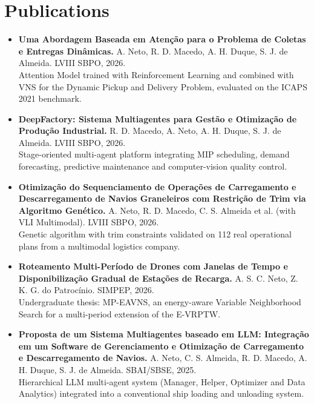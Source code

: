 \documentclass[a4paper,10pt]{article}
\begin{document}
\section*{ Publications}
\begin{itemize}[label=]
    \item \textbf{Uma Abordagem Baseada em Atenção para o Problema de Coletas e Entregas Dinâmicas.} A. Neto, R. D. Macedo, A. H. Duque, S. J. de Almeida. LVIII SBPO, 2026. \\
    Attention Model trained with Reinforcement Learning and combined with VNS for the Dynamic Pickup and Delivery Problem, evaluated on the ICAPS 2021 benchmark.
    \item \textbf{DeepFactory: Sistema Multiagentes para Gestão e Otimização de Produção Industrial.} R. D. Macedo, A. Neto, A. H. Duque, S. J. de Almeida. LVIII SBPO, 2026. \\
    Stage-oriented multi-agent platform integrating MIP scheduling, demand forecasting, predictive maintenance and computer-vision quality control.
    \item \textbf{Otimização do Sequenciamento de Operações de Carregamento e Descarregamento de Navios Graneleiros com Restrição de Trim via Algoritmo Genético.} A. Neto, R. D. Macedo, C. S. Almeida et al. (with VLI Multimodal). LVIII SBPO, 2026. \\
    Genetic algorithm with trim constraints validated on 112 real operational plans from a multimodal logistics company.
    \item \textbf{Roteamento Multi-Período de Drones com Janelas de Tempo e Disponibilização Gradual de Estações de Recarga.} A. S. C. Neto, Z. K. G. do Patrocínio. SIMPEP, 2026. \\
    Undergraduate thesis: MP-EAVNS, an energy-aware Variable Neighborhood Search for a multi-period extension of the E-VRPTW.
    \item \textbf{Proposta de um Sistema Multiagentes baseado em LLM: Integração em um Software de Gerenciamento e Otimização de Carregamento e Descarregamento de Navios.} A. Neto, C. S. Almeida, R. D. Macedo, A. H. Duque, S. J. de Almeida. SBAI/SBSE, 2025. \\
    Hierarchical LLM multi-agent system (Manager, Helper, Optimizer and Data Analytics) integrated into a conventional ship loading and unloading system.
\end{itemize}
\end{document}
